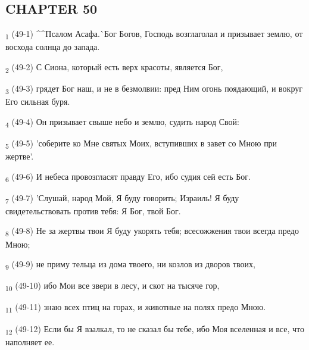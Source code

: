 \subsection{CHAPTER 50}
\begin{tcolorbox}
\textsubscript{1} (49-1) ^^Псалом Асафа.^^ Бог Богов, Господь возглаголал и призывает землю, от восхода солнца до запада.
\end{tcolorbox}
\begin{tcolorbox}
\textsubscript{2} (49-2) С Сиона, который есть верх красоты, является Бог,
\end{tcolorbox}
\begin{tcolorbox}
\textsubscript{3} (49-3) грядет Бог наш, и не в безмолвии: пред Ним огонь поядающий, и вокруг Его сильная буря.
\end{tcolorbox}
\begin{tcolorbox}
\textsubscript{4} (49-4) Он призывает свыше небо и землю, судить народ Свой:
\end{tcolorbox}
\begin{tcolorbox}
\textsubscript{5} (49-5) 'соберите ко Мне святых Моих, вступивших в завет со Мною при жертве'.
\end{tcolorbox}
\begin{tcolorbox}
\textsubscript{6} (49-6) И небеса провозгласят правду Его, ибо судия сей есть Бог.
\end{tcolorbox}
\begin{tcolorbox}
\textsubscript{7} (49-7) 'Слушай, народ Мой, Я буду говорить; Израиль! Я буду свидетельствовать против тебя: Я Бог, твой Бог.
\end{tcolorbox}
\begin{tcolorbox}
\textsubscript{8} (49-8) Не за жертвы твои Я буду укорять тебя; всесожжения твои всегда предо Мною;
\end{tcolorbox}
\begin{tcolorbox}
\textsubscript{9} (49-9) не приму тельца из дома твоего, ни козлов из дворов твоих,
\end{tcolorbox}
\begin{tcolorbox}
\textsubscript{10} (49-10) ибо Мои все звери в лесу, и скот на тысяче гор,
\end{tcolorbox}
\begin{tcolorbox}
\textsubscript{11} (49-11) знаю всех птиц на горах, и животные на полях предо Мною.
\end{tcolorbox}
\begin{tcolorbox}
\textsubscript{12} (49-12) Если бы Я взалкал, то не сказал бы тебе, ибо Моя вселенная и все, что наполняет ее.
\end{tcolorbox}

